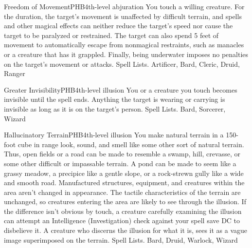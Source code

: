 \begin{spell}{Freedom of Movement}{PHB}{4th-level abjuration}
{
}
You touch a willing creature. For the duration, the target’s movement is unaffected by difficult terrain, and spells and other magical effects can neither reduce the target’s speed nor cause the target to be paralyzed or restrained.
The target can also spend 5 feet of movement to automatically escape from nonmagical restraints, such as manacles or a creature that has it grappled. Finally, being underwater imposes no penalties on the target’s movement or attacks.
Spell Lists. Artificer, Bard, Cleric, Druid, Ranger
\end{spell}

\begin{spell}{Greater Invisibility}{PHB}{4th-level illusion}
{
}
You or a creature you touch becomes invisible until the spell ends. Anything the target is wearing or carrying is invisible as long as it is on the target’s person.
Spell Lists. Bard, Sorcerer, Wizard
\end{spell}

\begin{spell}{Hallucinatory Terrain}{PHB}{4th-level illusion}
{
}
You make natural terrain in a 150-foot cube in range look, sound, and smell like some other sort of natural terrain. Thus, open fields or a road can be made to resemble a swamp, hill, crevasse, or some other difficult or impassable terrain. A pond can be made to seem like a grassy meadow, a precipice like a gentle slope, or a rock-strewn gully like a wide and smooth road. Manufactured structures, equipment, and creatures within the area aren’t changed in appearance.
The tactile characteristics of the terrain are unchanged, so creatures entering the area are likely to see through the illusion. If the difference isn’t obvious by touch, a creature carefully examining the illusion can attempt an Intelligence (Investigation) check against your spell save DC to disbelieve it. A creature who discerns the illusion for what it is, sees it as a vague image superimposed on the terrain.
Spell Lists. Bard, Druid, Warlock, Wizard
\end{spell}

